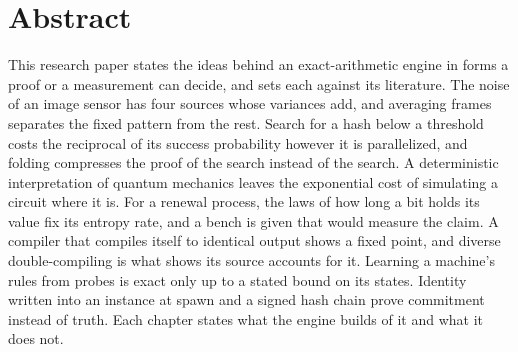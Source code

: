 \chapter*{Abstract}

This research paper states the ideas behind an exact-arithmetic engine in forms a proof or a
measurement can decide, and sets each against its literature. The noise of an image sensor has four
sources whose variances add, and averaging frames separates the fixed pattern from the rest. Search
for a hash below a threshold costs the reciprocal of its success probability however it is
parallelized, and folding compresses the proof of the search instead of the search. A deterministic
interpretation of quantum mechanics leaves the exponential cost of simulating a circuit where it is.
For a renewal process, the laws of how long a bit holds its value fix its entropy rate, and a bench
is given that would measure the claim. A compiler that compiles itself to identical output shows a
fixed point, and diverse double-compiling is what shows its source accounts for it. Learning a
machine's rules from probes is exact only up to a stated bound on its states. Identity written into an
instance at spawn and a signed hash chain prove commitment instead of truth. Each chapter states what the
engine builds of it and what it does not.
\cleardoublepage
